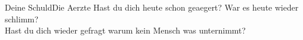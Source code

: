 \begin{song}{Deine Schuld}{Die Aerzte}
    Hast du dich heute schon geaegert? War es heute wieder schlimm? \\
    Hast du dich wieder gefragt warum kein Mensch was unternimmt? \\
\end{song}
